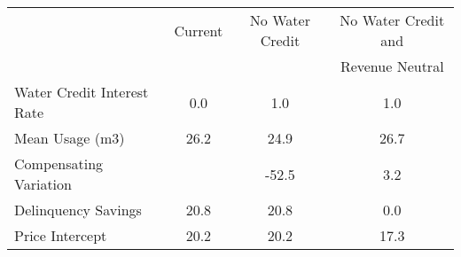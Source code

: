 \begin{tabular}{lccc}
& Current & No Water Credit & No Water Credit and \\
&         &                  & Revenue Neutral \\
Water Credit Interest Rate &0.0&1.0&1.0\\
Mean Usage (m3) &26.2&24.9&26.7\\
Compensating Variation  & &-52.5&3.2\\
Delinquency Savings  &20.8&20.8&0.0\\
Price Intercept  &20.2&20.2&17.3\\
\end{tabular} 
